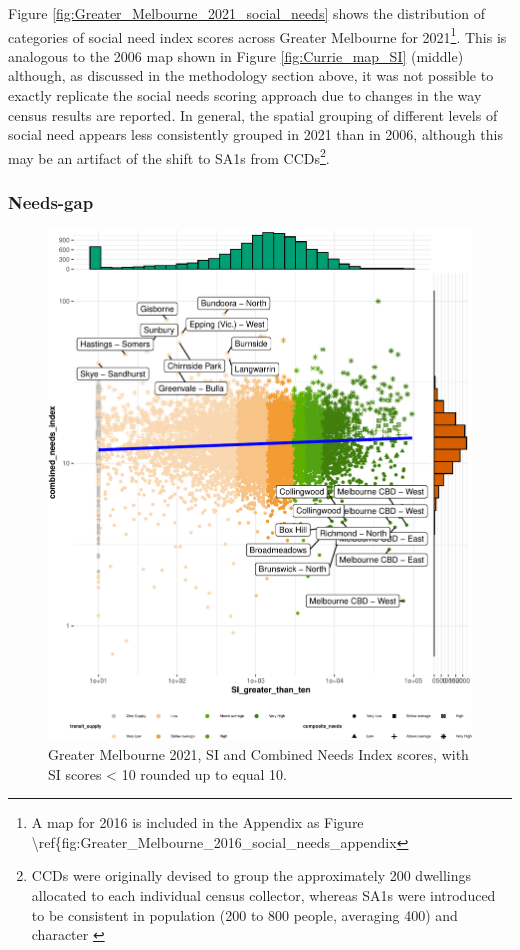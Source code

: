 \documentclass[preprint, 3p,
authoryear]{elsarticle} %
\begin{document}
Figure \ref{fig:Greater_Melbourne_2021_social_needs} shows the
distribution of categories of social need index scores across Greater
Melbourne for 2021\footnote{A map for 2016 is included in the Appendix
  as Figure
  \textbackslash ref\{fig:Greater\_Melbourne\_2016\_social\_needs\_appendix}.
This is analogous to the 2006 map shown in Figure
\ref{fig:Currie_map_SI} (middle) although, as discussed in the
methodology section above, it was not possible to exactly replicate the
\citet{currie2010identifying} social needs scoring approach due to
changes in the way census results are reported. In general, the spatial
grouping of different levels of social need appears less consistently
grouped in 2021 than in 2006, although this may be an artifact of the
shift to SA1s from CCDs\footnote{CCDs were originally devised to group
  the approximately 200 dwellings allocated to each individual census
  collector, whereas SA1s were introduced to be consistent in population
  (200 to 800 people, averaging 400) and character \citep{ABS_SA1s_CCDs}}.

\hypertarget{needs-gap}{%
\subsubsection{Needs-gap}\label{needs-gap}}

\begin{figure}
\centering
\includegraphics{ReynoldsCurrieQu2024_files/figure-latex/Greater_Melbourne_2021_needs_gap_scatterplot_figure-1.pdf}
\caption{Greater Melbourne 2021, SI and Combined Needs Index scores,
with SI scores \textless{} 10 rounded up to equal 10.}
\end{figure}
\end{document}
